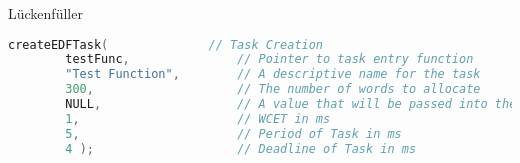 \documentclass[../EDF Master Thesis.tex]{subfiles}
\begin{document}
    Lückenfüller

\begin{lstlisting}[language=C, caption=FreeRTOS Task creation and deletion]
    createEDFTask(              // Task Creation
        testFunc,               // Pointer to task entry function
        "Test Function",        // A descriptive name for the task
        300,                    // The number of words to allocate
        NULL,                   // A value that will be passed into the task 
        1,                      // WCET in ms
        5,                      // Period of Task in ms
        4 );                    // Deadline of Task in ms
\end{lstlisting}
\end{document}
